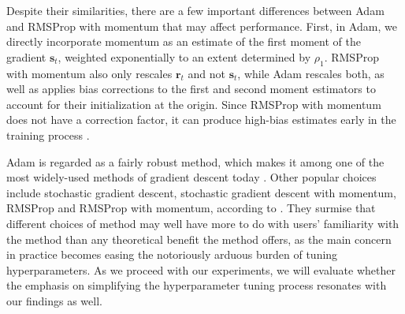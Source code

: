 Despite their similarities, there are a few important differences between Adam and RMSProp with momentum that may affect performance. First, in Adam, we directly incorporate momentum as an estimate of the first moment of the gradient $\boldsymbol s_t$, weighted exponentially to an extent determined by $\rho_1$. RMSProp with momentum also only rescales $\boldsymbol r_t$ and not $\boldsymbol s_t$, while Adam rescales both, as well as applies bias corrections to the first and second moment estimators to account for their initialization at the origin. Since RMSProp with momentum does not have a correction factor, it can produce high-bias estimates early in the training process \cite{deeplearningbookChapter8}. 

Adam is regarded as a fairly robust method, which makes it among one of the most widely-used methods of gradient descent today \cite{deeplearningbookChapter8}. Other popular choices include stochastic gradient descent, stochastic gradient descent with momentum, RMSProp and RMSProp with momentum, according to \textcite{deeplearningbookChapter8}. They surmise that different choices of method may well have more to do with users' familiarity with the method than any theoretical benefit the method offers, as the main concern in practice becomes easing the notoriously arduous burden of tuning hyperparameters. As we proceed with our experiments, we will evaluate whether the emphasis on simplifying the hyperparameter tuning process resonates with our findings as well.





